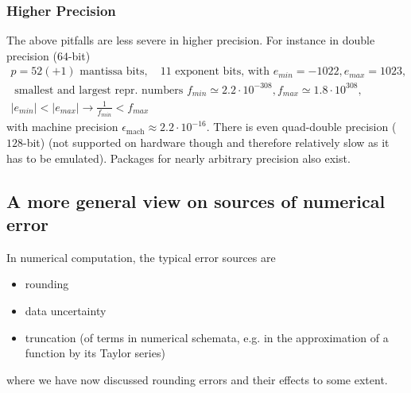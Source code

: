 \subsubsection{Higher Precision}
The above pitfalls are less severe in higher precision. For instance in double precision ($64$-bit)
\begin{equation}
    \begin{multlined}
        p = 52(+1) \text{ mantissa bits}, \quad 11 \text{ exponent bits, with } e_{min} = -1022, e_{max} = 1023,\\ \text{ smallest and largest repr. numbers } f_{min} \simeq 2.2 \cdot 10^{-308}, f_{max} \simeq 1.8 \cdot 10^{308},\\ |e_{min}| < |e_{max}| \rightarrow \frac{1}{f_{min}} < f_{max}
    \end{multlined}
\end{equation}
with machine precision $\epsilon_{\text{mach}} \approx 2.2 \cdot 10^{-16}$. There is even quad-double precision ($128$-bit) (not supported on hardware though and therefore relatively slow as it has to be emulated). Packages for nearly arbitrary precision also exist.

\subsection{A more general view on sources of numerical error}
In numerical computation, the typical error sources are
\begin{itemize}
    \item rounding
    \item data uncertainty
    \item truncation (of terms in numerical schemata, e.g. in the approximation of a function by its Taylor series)
\end{itemize}
where we have now discussed rounding errors and their effects to some extent.

